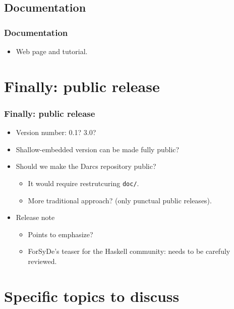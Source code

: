 \documentclass{beamer}
\begin{document}
\subsection{Documentation}

\begin{frame}
  \frametitle{Documentation}
  \begin{itemize}
  \item Web page and tutorial.
  \end{itemize}
  
\end{frame}

\section{Finally: public release}

\begin{frame}
  \frametitle{Finally: public release}
 \begin{itemize}
 \item Version number: 0.1? 3.0?
 \item Shallow-embedded version can be made fully public?
 \item Should we make the Darcs repository public?
   \begin{itemize}
   \item It would require restrutcuring \texttt{doc/}.
   \item More traditional approach? (only punctual public releases).
   \end{itemize}
 \item Release note
   \begin{itemize}
     \item Points to emphasize?
     \item ForSyDe's teaser for the Haskell community: needs to be
       carefuly reviewed.
     \end{itemize}
 \end{itemize}
\end{frame}


\section{Specific topics to discuss}
\end{document}
